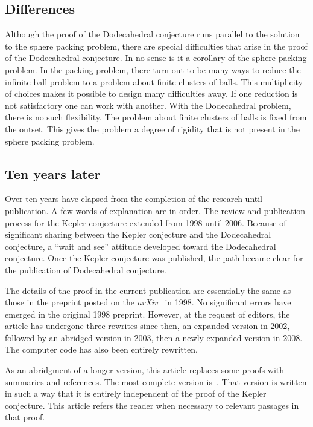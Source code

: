 \documentclass{article} %
\begin{document}
\subsection{Differences}

Although the proof of the Dodecahedral conjecture runs parallel to the
solution to the sphere packing problem, there are special difficulties
that arise in the proof of the Dodecahedral conjecture. In no sense is
it a corollary of the sphere packing problem. In the packing problem,
there turn out to be many ways to reduce the infinite ball problem to
a problem about finite clusters of balls. This multiplicity of choices
makes it possible to design many difficulties away. If one reduction
is not satisfactory one can work with another. With the Dodecahedral
problem, there is no such flexibility. The problem about finite
clusters of balls is fixed from the outset. This gives the problem a
degree of rigidity that is not present in the sphere packing problem.

\subsection{Ten years later}

Over ten years have elapsed from the completion of the research until
publication. A few words of explanation are in order. The review and
publication process for the Kepler conjecture extended from 1998 until
2006. Because of significant sharing between the Kepler conjecture and
the Dodecahedral conjecture, a ``wait and see'' attitude developed
toward the Dodecahedral conjecture. Once the Kepler conjecture was
published, the path became clear for the publication of Dodecahedral
conjecture.

The details of the proof in the current publication are essentially
the same as those in the preprint posted on the
\emph{arXiv}~\cite{website:arXiv} in 1998. No significant errors have
emerged in the original 1998 preprint. However, at the request of
editors, the article has undergone three rewrites since then, an
expanded version in 2002, followed by an abridged version in 2003,
then a newly expanded version in 2008. The computer code has also been
entirely rewritten.


As an abridgment of a longer version, this article replaces some
proofs with summaries and references. The most complete version
is~\cite{Hales:2002:Dodec}. That version is written in such a way that
it is entirely independent of the proof of the Kepler conjecture. This
article refers the reader when necessary to relevant passages in that
proof.
\end{document}
